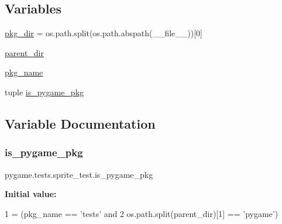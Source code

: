 \subsection*{Variables}
\begin{DoxyCompactItemize}
\item 
\hyperlink{namespacepygame_1_1tests_1_1sprite__test_ad4220cb6a7d65658a8bba79893666d6d}{pkg\+\_\+dir} = os.\+path.\+split(os.\+path.\+abspath(\+\_\+\+\_\+file\+\_\+\+\_\+))\mbox{[}0\mbox{]}
\item 
\hyperlink{namespacepygame_1_1tests_1_1sprite__test_a49328975c205d22e9db99549a1916998}{parent\+\_\+dir}
\item 
\hyperlink{namespacepygame_1_1tests_1_1sprite__test_a9a84009726e6f4f3df792594729d824e}{pkg\+\_\+name}
\item 
tuple \hyperlink{namespacepygame_1_1tests_1_1sprite__test_a7e66606f4452c85d137a748cdf75624a}{is\+\_\+pygame\+\_\+pkg}
\end{DoxyCompactItemize}


\subsection{Variable Documentation}
\mbox{\label{namespacepygame_1_1tests_1_1sprite__test_a7e66606f4452c85d137a748cdf75624a}} 
\subsubsection{\texorpdfstring{is\+\_\+pygame\+\_\+pkg}{is\_pygame\_pkg}}
{\footnotesize\ttfamily pygame.\+tests.\+sprite\+\_\+test.\+is\+\_\+pygame\+\_\+pkg}

{\bfseries Initial value\+:}
\begin{DoxyCode}
1 =  (pkg\_name == \textcolor{stringliteral}{'tests'} \textcolor{keywordflow}{and}
2                      os.path.split(parent\_dir)[1] == \textcolor{stringliteral}{'pygame'})
\end{DoxyCode}
\mbox{\label{namespacepygame_1_1tests_1_1sprite__test_a49328975c205d22e9db99549a1916998}} 
